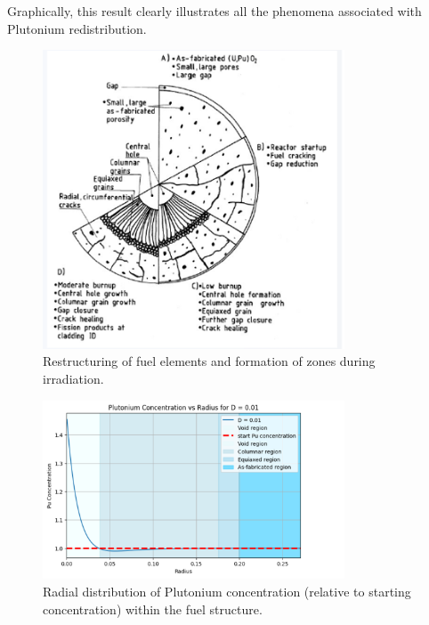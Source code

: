 Graphically, this result clearly illustrates all the phenomena associated with Plutonium redistribution.

\begin{figure}[H]
\centering
\includegraphics[width=0.8\textwidth]{Pu_redistributio_explaination.png}
\caption{Restructuring of fuel elements and formation of zones during irradiation.}
\label{fig:Redistribution_Structure}
\end{figure}

\begin{figure}[H]
\centering
\includegraphics[width=0.8\textwidth]{Pu_redistribution_profile.png}
\caption{Radial distribution of Plutonium concentration (relative to starting concentration) within the fuel structure.}
\label{fig:Pu_Profile}
\end{figure}
